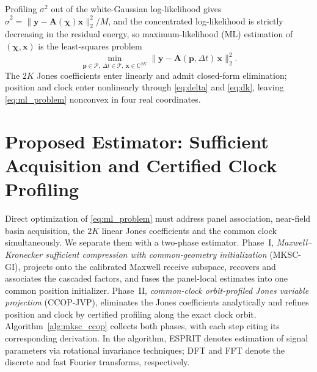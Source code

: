 \documentclass[letterpaper,journal]{IEEEtran}
\newcommand{\C}{\mathbb{C}}
\newcommand{\bp}{\mathbf{p}}
\newcommand{\bx}{\mathbf{x}}
\newcommand{\by}{\mathbf{y}}
\newcommand{\bA}{\mathbf{A}}
\newcommand{\bchi}{\boldsymbol{\chi}}
\begin{document}
Profiling $\sigma^2$ out of the white-Gaussian log-likelihood gives
$\widehat\sigma^2=\|\by-\bA(\bchi)\bx\|_2^2/M$, and the concentrated
log-likelihood is strictly decreasing in the residual energy, so maximum-likelihood (ML)
estimation of $(\bchi,\bx)$ is the least-squares problem
\begin{equation}
	\min_{\bp\in\mathcal P,\ \Delta t\in\mathcal T,\ \bx\in\C^{2K}}
	\big\|\by-\bA(\bp,\Delta t)\,\bx\big\|_2^2.
	\label{eq:ml_problem}
\end{equation}
The $2K$ Jones coefficients enter linearly and admit closed-form
elimination; position and clock enter nonlinearly through
\eqref{eq:delta} and \eqref{eq:dk}, leaving \eqref{eq:ml_problem} nonconvex
in four real coordinates.

\section{Proposed Estimator: Sufficient Acquisition and Certified Clock Profiling}
\label{sec:algorithm}

Direct optimization of \eqref{eq:ml_problem} must address panel association,
near-field basin acquisition, the $2K$ linear Jones coefficients and the common
clock simultaneously. We separate them with a two-phase estimator. Phase~I,
\emph{Maxwell--Kronecker sufficient compression with common-geometry
initialization} (MKSC-GI), projects onto the calibrated Maxwell receive
subspace, recovers and associates the cascaded factors, and fuses the
panel-local estimates into one common position initializer. Phase~II,
\emph{common-clock orbit-profiled Jones variable projection} (CCOP-JVP),
eliminates the Jones coefficients analytically and refines position and
clock by certified profiling along the exact clock orbit.
Algorithm~\ref{alg:mksc_ccop} collects both phases, with each step citing its
corresponding derivation. In the algorithm, ESPRIT denotes estimation of
signal parameters via rotational invariance techniques; DFT and FFT denote
the discrete and fast Fourier transforms, respectively.
\end{document}
